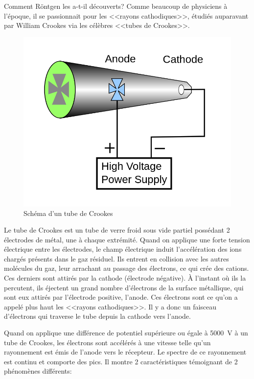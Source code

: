 Comment Röntgen les a-t-il découverts? Comme beaucoup de physiciens à l'époque, il se passionnait pour les <<rayons cathodiques>>, étudiés auparavant par William Crookes via les célèbres <<tubes de Crookes>>.

\begin{figure}[ht]
    \centering
    \includegraphics[scale=0.20]{Images1/tubecrookes.png}
    \caption{Schéma d'un tube de Crookes}
\end{figure}

Le tube de Crookes est un tube de verre froid sous vide partiel possédant 2 électrodes de métal, une à chaque extrémité. Quand on applique une forte tension électrique entre les électrodes, le champ électrique induit l'accélération des ions chargés présents dans le gaz résiduel. Ils entrent en collision avec les autres molécules du gaz, leur arrachant au passage des électrons, ce qui crée des cations. Ces derniers sont attirés par la cathode (électrode négative). À l'instant où ils la percutent, ils éjectent un grand nombre d'électrons de la surface métallique, qui sont eux attirés par l'électrode positive, l'anode. Ces électrons sont ce qu'on a appelé plus haut les <<rayons cathodiques>>. Il y a donc un faisceau d'électrons qui traverse le tube depuis la cathode vers l'anode.

Quand on applique une différence de potentiel supérieure ou égale à \SI{5 000}{V} à un tube de Crookes, les électrons sont accélérés à une vitesse telle qu'un rayonnement est émis de l'anode vers le récepteur. Le spectre de ce rayonnement est continu et comporte des pics. Il montre 2 caractéristiques témoignant de 2 phénomènes différents:


